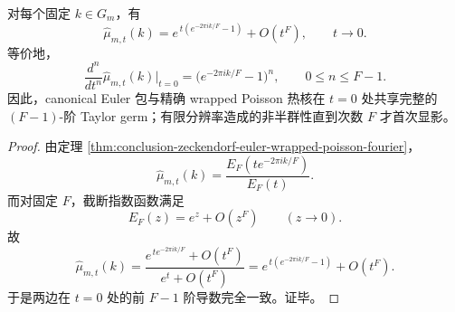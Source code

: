 \begin{proposition}\label{prop:conclusion-zeckendorf-euler-fminusone-jet-rigidity}
对每个固定 \(k\in G_m\)，有
\[
\widehat\mu_{m,t}(k)
=
e^{\,t(e^{-2\pi i k/F}-1)}+O(t^F),
\qquad
t\to 0.
\]
等价地，
\[
\frac{d^n}{dt^n}\widehat\mu_{m,t}(k)\Big|_{t=0}
=
\bigl(e^{-2\pi i k/F}-1\bigr)^n,
\qquad
0\le n\le F-1.
\]
因此，canonical Euler 包与精确 wrapped Poisson 热核在 \(t=0\) 处共享完整的 \((F-1)\)-阶 Taylor germ；有限分辨率造成的非半群性直到次数 \(F\) 才首次显影。
\end{proposition}
\begin{proof}
由定理 \ref{thm:conclusion-zeckendorf-euler-wrapped-poisson-fourier}，
\[
\widehat\mu_{m,t}(k)=\frac{E_F(te^{-2\pi i k/F})}{E_F(t)}.
\]
而对固定 \(F\)，截断指数函数满足
\[
E_F(z)=e^z+O(z^F)
\qquad (z\to 0).
\]
故
\[
\widehat\mu_{m,t}(k)
=
\frac{e^{\,te^{-2\pi i k/F}}+O(t^F)}{e^t+O(t^F)}
=
e^{\,t(e^{-2\pi i k/F}-1)}+O(t^F).
\]
于是两边在 \(t=0\) 处的前 \(F-1\) 阶导数完全一致。证毕。
\end{proof}

